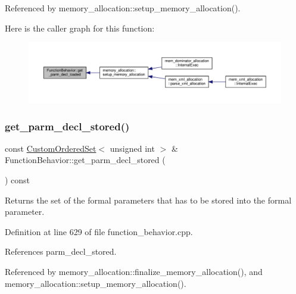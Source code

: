 Referenced by memory\+\_\+allocation\+::setup\+\_\+memory\+\_\+allocation().

Here is the caller graph for this function\+:
\nopagebreak
\begin{figure}[H]
\begin{center}
\leavevmode
\includegraphics[width=350pt]{d9/d45/classFunctionBehavior_a93a9a59f4fdc831007c3ec616a9ca3a2_icgraph}
\end{center}
\end{figure}
\mbox{\label{classFunctionBehavior_add32fdf1e32aab5388fb8326ec0d7916}} 
\subsubsection{\texorpdfstring{get\+\_\+parm\+\_\+decl\+\_\+stored()}{get\_parm\_decl\_stored()}}
{\footnotesize\ttfamily const \hyperlink{classCustomOrderedSet}{Custom\+Ordered\+Set}$<$ unsigned int $>$ \& Function\+Behavior\+::get\+\_\+parm\+\_\+decl\+\_\+stored (\begin{DoxyParamCaption}{ }\end{DoxyParamCaption}) const}



Returns the set of the formal parameters that has to be stored into the formal parameter. 



Definition at line 629 of file function\+\_\+behavior.\+cpp.



References parm\+\_\+decl\+\_\+stored.



Referenced by memory\+\_\+allocation\+::finalize\+\_\+memory\+\_\+allocation(), and memory\+\_\+allocation\+::setup\+\_\+memory\+\_\+allocation().

